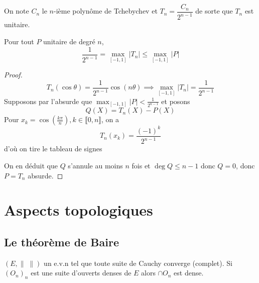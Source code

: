 
On note $C_n$ le $n$-ième polynôme de Tchebychev et $T_n=\dfrac{C_n}{2^{n-1}}$ de sorte que $T_n$ est unitaire.

\begin{res}
Pour tout $P$ unitaire de degré $n$, \[
    \frac 1{2^{n-1}}=\max_{[-1, 1]}|T_n|\leq \max_{[-1, 1]}|P|
\]
\end{res}

\begin{proof}
\[
    T_n(\cos \theta)=\frac1{2^{n-1}}\cos (n\theta) \implies \max_{[-1, 1]}|T_n|=\frac1{2^{n-1}}
\]
Supposons par l'absurde que $\displaystyle\max_{[-1, 1]}|P|<\frac1{2^{n-1}}$ et posons \[
    Q(X)=T_n(X)-P(X)
\]
Pour $x_k=\cos\left(\frac{k\pi}n\right), k\in\llbracket 0, n\rrbracket$, on a \[
    T_n(x_k)=\frac{(-1)^k}{2^{n-1}}
\]
d'où on tire le tableau de signes
\begin{center}
\end{center}
On en déduit que $Q$ s'annule au moins $n$ fois et $\deg Q\leq n-1$ donc $Q=0$, donc $P=T_n$ absurde.
\end{proof}


\section{Aspects topologiques}

\subsection{Le théorème de Baire}

\begin{res}
    $(E, \|\;\|)$ un e.v.n tel que toute suite de Cauchy converge (complet). Si $(O_n)_n$ est une suite d'ouverts denses de $E$ alors $\cap O_n$ est dense.
\end{res}

